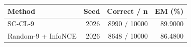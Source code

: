 \begin{tabular}{lrrr}
\toprule
Method & Seed & Correct / n & EM (\%) \\
\midrule
SC-CL-9 & 2026 & 8990 / 10000 & 89.9000 \\
Random-9 + InfoNCE & 2026 & 8648 / 10000 & 86.4800 \\
\bottomrule
\end{tabular}
